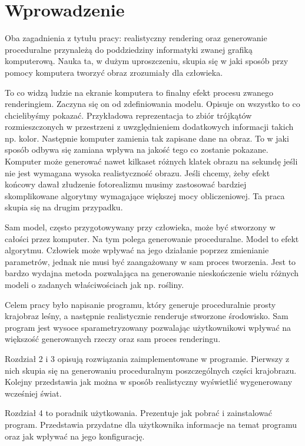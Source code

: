 \documentclass[inz,longabstract]{iithesis}
\author         {Bartosz Rudzki}
\begin{document}
\chapter{Wprowadzenie}
    Oba zagadnienia z tytułu pracy: realistyczny rendering oraz generowanie proceduralne przynależą do poddziedziny informatyki zwanej grafiką komputerową. Nauka ta, w dużym uproszczeniu, skupia się w jaki sposób przy pomocy komputera tworzyć obraz zrozumiały dla człowieka. 
    
    To co widzą ludzie na ekranie komputera to finalny efekt procesu zwanego renderingiem. Zaczyna się on od zdefiniowania modelu. Opisuje on wszystko to co chcielibyśmy pokazać. Przykładowa reprezentacja to zbiór trójkątów rozmieszczonych w przestrzeni z uwzględnieniem dodatkowych informacji takich np. kolor. Następnie komputer zamienia tak zapisane dane na obraz. To w jaki sposób odbywa się zamiana wpływa na jakość tego co zostanie pokazane. Komputer może generować nawet kilkaset różnych klatek obrazu na sekundę jeśli nie jest wymagana wysoka realistyczność obrazu. Jeśli chcemy, żeby efekt końcowy dawał złudzenie fotorealizmu musimy zastosować bardziej skomplikowane algorytmy wymagające większej mocy obliczeniowej. Ta praca skupia się na drugim przypadku.  
    
    Sam model, często przygotowywany przy człowieka, może być stworzony w całości przez komputer. Na tym polega generowanie proceduralne. Model to efekt algorytmu. Człowiek może wpływać na jego działanie poprzez zmienianie parametrów, jednak nie musi być zaangażowany w sam proces tworzenia. Jest to bardzo wydajna metoda pozwalająca na generowanie nieskończenie wielu różnych modeli o zadanych właściwościach jak np. rośliny.
    
    Celem pracy było napisanie programu, który generuje proceduralnie prosty krajobraz leśny, a następnie realistycznie renderuje stworzone środowisko.
    Sam program jest wysoce sparametryzowany pozwalając użytkownikowi wpływać na większość generowanych rzeczy oraz sam proces renderingu.
    
    Rozdział 2 i 3 opisują rozwiązania zaimplementowane w programie. Pierwszy z nich skupia się na generowaniu proceduralnym poszczególnych części krajobrazu. Kolejny przedstawia jak można w sposób realistyczny wyświetlić wygenerowany wcześniej świat.
    
    Rozdział 4 to poradnik użytkowania. Prezentuje jak pobrać i zainstalować program. Przedstawia przydatne dla użytkownika informacje na temat programu oraz jak wpływać na jego konfigurację.
    
\end{document}

